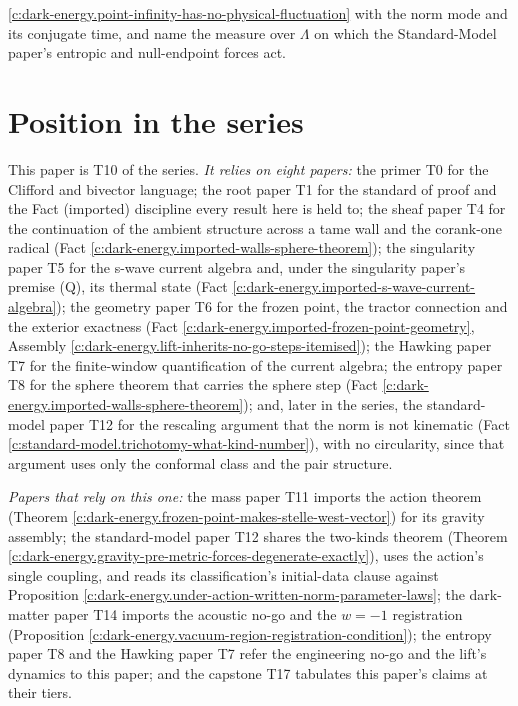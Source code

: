 \documentclass[11pt]{article}
\theoremstyle{definition}
\theoremstyle{plain}
\begin{document}
\ref{c:dark-energy.point-infinity-has-no-physical-fluctuation} with the norm mode and its conjugate time, and name the measure over $\Lambda$ on which the Standard-Model paper's entropic and null-endpoint forces act.

\section{Position in the series}

\label{c:note.dark-energy.setting-position-series}
This paper is T10 of the series. \emph{It relies on eight papers:} the primer T0 \cite{ButlerT0} for the Clifford and bivector language; the root paper T1 \cite{ButlerT1} for the standard of proof and the Fact (imported) discipline every result here is held to; the sheaf paper T4 \cite{ButlerT4} for the continuation of the ambient structure across a tame wall and the corank-one radical (Fact \ref{c:dark-energy.imported-walls-sphere-theorem}); the singularity paper T5 \cite{ButlerT5} for the s-wave current algebra and, under the singularity paper's premise (Q), its thermal state (Fact \ref{c:dark-energy.imported-s-wave-current-algebra}); the geometry paper T6 \cite{ButlerT6} for the frozen point, the tractor connection and the exterior exactness (Fact \ref{c:dark-energy.imported-frozen-point-geometry}, Assembly \ref{c:dark-energy.lift-inherits-no-go-steps-itemised}); the Hawking paper T7 \cite{ButlerT7} for the finite-window quantification of the current algebra; the entropy paper T8 \cite{ButlerT8} for the sphere theorem that carries the sphere step (Fact \ref{c:dark-energy.imported-walls-sphere-theorem}); and, later in the series, the standard-model paper T12 \cite{ButlerT12} for the rescaling argument that the norm is not kinematic (Fact \ref{c:standard-model.trichotomy-what-kind-number}), with no circularity, since that argument uses only the conformal class and the pair structure.

\emph{Papers that rely on this one:} the mass paper T11 \cite{ButlerT11} imports the action theorem (Theorem \ref{c:dark-energy.frozen-point-makes-stelle-west-vector}) for its gravity assembly; the standard-model paper T12 \cite{ButlerT12} shares the two-kinds theorem (Theorem \ref{c:dark-energy.gravity-pre-metric-forces-degenerate-exactly}), uses the action's single coupling, and reads its classification's initial-data clause against Proposition \ref{c:dark-energy.under-action-written-norm-parameter-laws}; the dark-matter paper T14 \cite{ButlerT14} imports the acoustic no-go and the $w = -1$ registration (Proposition \ref{c:dark-energy.vacuum-region-registration-condition}); the entropy paper T8 \cite{ButlerT8} and the Hawking paper T7 \cite{ButlerT7} refer the engineering no-go and the lift's dynamics to this paper; and the capstone T17 \cite{ButlerT17} tabulates this paper's claims at their tiers.
\end{document}
